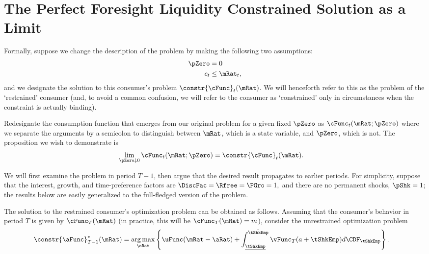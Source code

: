 \documentclass[\econtexRoot/BufferStockTheory]{subfiles}
\begin{document}
  \section{The Perfect Foresight Liquidity Constrained Solution as a Limit}
\label{sec:LiqConstrAsLimit}

Formally, suppose we change the description of the problem by making
the following two assumptions:
\begin{eqnarray*}
    \pZero   & = 0
\\  c_{t} & \leq  \mRat_{t} \label{eq:liqconstr},
\end{eqnarray*}
and we designate the solution to this consumer's problem
$\constr{\cFunc}_{t}(\mRat)$.  We will henceforth refer to this as the
problem of the `restrained' consumer (and, to avoid a common
confusion, we will refer to the consumer as `constrained' only in
circumstances when the constraint is actually binding).

Redesignate the consumption function that emerges from our original
problem for a given fixed $\pZero$ as $\cFunc_{t}(\mRat;\pZero)$ where we
separate the arguments by a semicolon to distinguish between $\mRat$,
which is a state variable, and $\pZero$, which is not.  The
proposition we wish to demonstrate is
\begin{equation}\begin{gathered}\begin{aligned}
  \lim_{\pZero \downarrow 0} \cFunc_{t}(\mRat;\pZero)  & = \constr{\cFunc}_{t}(\mRat). \label{eq:RestrEqUnrestr} 
\end{aligned}\end{gathered}\end{equation}

We will first examine the problem in period $T-1$, then
argue that the desired result propagates to earlier periods.
For simplicity, suppose that the interest, growth, and time-preference
factors are $\DiscFac = \Rfree = \PGro = 1,$ and there are no permanent
shocks, $\pShk=1$; the results below are easily generalized
to the full-fledged version of the problem.

The solution to the restrained consumer's optimization problem can be
obtained as follows.  Assuming that the consumer's behavior in period
$T$ is given by $\cFunc_{T}(\mRat)$ (in practice, this will be
$\cFunc_{T}(\mRat)=m$), consider the unrestrained optimization problem
\begin{equation}\begin{gathered}\begin{aligned}
  \constr{\aFunc}^{*}_{T-1}(\mRat)  & = \underset{\aRat}{\arg \max} \left\{\uFunc(\mRat-\aRat) +  \int_{\underline{\tShkEmp}}^{\bar{\tShkEmp}} \vFunc_{T}(a+\tShkEmp) d\CDF_{\tShkEmp} \right\}. \label{eq:vUnconstr}
\end{aligned}\end{gathered}\end{equation}
\end{document}
